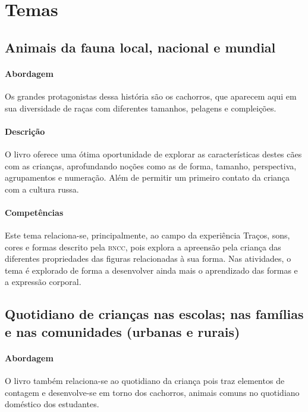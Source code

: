 \documentclass[11pt]{extarticle}
\begin{document}
\section{Temas}

\subsection{Animais da fauna local, nacional e mundial}

\paragraph{Abordagem} Os grandes protagonistas dessa história são os cachorros, que aparecem aqui em sua diversidade de raças com diferentes tamanhos, pelagens e compleições.

\paragraph{Descrição} O livro oferece uma ótima oportunidade de explorar 
as características destes cães com as crianças, aprofundando noções como as de forma, tamanho, perspectiva, agrupamentos e numeração. Além de permitir um primeiro contato da criança com a cultura russa.

\paragraph{Competências} Este tema relaciona-se, principalmente, ao 
campo da experiência Traços, sons, cores e formas
descrito pela \textsc{bncc}, pois explora a apreensão pela criança das diferentes propriedades das figuras relacionadas à sua forma. Nas atividades, o tema é explorado de forma a desenvolver ainda mais o aprendizado das formas e a expressão corporal.

\subsection{Quotidiano de crianças nas escolas; nas famílias e nas comunidades (urbanas e rurais)}

\paragraph{Abordagem} O livro também relaciona-se ao quotidiano da criança pois traz elementos de contagem e desenvolve-se em torno dos cachorros, animais comuns no quotidiano doméstico dos estudantes.
\end{document}
